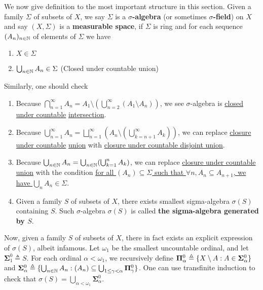 \documentclass{report}
\begin{document}
\begin{mdframed}
We now give definition to the most important structure in this section. Given a family $\Sigma$ of subsets of $X$,  we say $\Sigma$ is a \textbf{$\sigma$-algebra} (or sometimes \textbf{$\sigma$-field}) on $X$ and say $(X,\Sigma)$ is a \textbf{measurable space}, if $\Sigma$ is ring and for each sequence $(A_n)_{n\in\mathbb{N}}$ of elements of $\Sigma$ we have
\begin{enumerate}[label=(\alph*)]
  \item $X \in \Sigma$
  \item  $\bigcup_{n\in\mathbb{N}} A_n \in \Sigma$ (Closed under countable union)
\end{enumerate}
Similarly, one should check 
\begin{enumerate}[label=(\alph*)]
\label{pop_sig}
\item Because $\bigcap_{n=1}^{\infty}A_n = A_1 \setminus (\bigcup_{n=2}^{\infty}(A_1\setminus A_n))$, we see  $\sigma$-algebra is \underline{closed under countable} \underline{intersection}. 
\item Because $\bigcup_{n=1}^{\infty}A_n = \bigsqcup_{n=1}^{\infty} (A_n \setminus (\bigcup_{k=n+1}^{\infty} A_k))$, we can replace \underline{closure under countable} \underline{union} with \underline{closure under countable disjoint union}.  
\item Because $\bigcup_{n\in\mathbb{N}}A_n = \bigcup_{n\in\mathbb{N}} (\bigcup_{k=1}^n A_k)$, we can replace \underline{closure under countable union} with the condition \underline{for all  $(A_n)\subseteq \Sigma$ such that $\forall n,A_n \subseteq A_{n+1}$, we have $\bigcup_n A_n \in \Sigma$}.
\item Given a family $S$ of subsets of $X$, there exists smallest sigma-algebra $\sigma(S)$ containing $S$. Such $\sigma$-algebra $\sigma(S)$ is called \textbf{the sigma-algebra generated by $S$}.
\end{enumerate}
\label{consig}
Now, given a family $S$ of subsets of $X$, there in fact exists an explicit expression of $\sigma (S)$, albeit infamous. Let $\omega_1$ be the smallest uncountable ordinal, and let $\mathbf{\Sigma}^0_1\triangleq S$. For each ordinal $\alpha <\omega_1$, we recursively define $\mathbf{\Pi}^0_\alpha \triangleq  \{ X\setminus A: A \in \mathbf{\Sigma}^0_\alpha \}$ and $\mathbf{\Sigma}^0_\alpha \triangleq \{ \bigcup_{n\in\mathbb{N}}A_n: (A_n)\subseteq \bigcup_{1\leq \gamma <\alpha }\mathbf{\Pi}^0_\gamma  \}$. One can use transfinite induction to check that $\sigma (S)= \bigcup_{\alpha <\omega_1}\mathbf{\Sigma}^0_\alpha$.
\end{mdframed}
\end{document}
